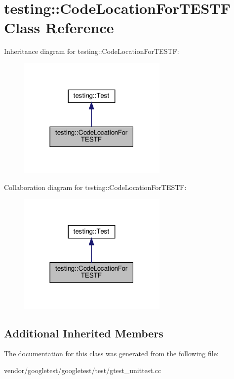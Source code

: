 \hypertarget{classtesting_1_1_code_location_for_t_e_s_t_f}{}\section{testing\+:\+:Code\+Location\+For\+T\+E\+S\+TF Class Reference}
\label{classtesting_1_1_code_location_for_t_e_s_t_f}


Inheritance diagram for testing\+:\+:Code\+Location\+For\+T\+E\+S\+TF\+:
\nopagebreak
\begin{figure}[H]
\begin{center}
\leavevmode
\includegraphics[width=206pt]{classtesting_1_1_code_location_for_t_e_s_t_f__inherit__graph}
\end{center}
\end{figure}


Collaboration diagram for testing\+:\+:Code\+Location\+For\+T\+E\+S\+TF\+:
\nopagebreak
\begin{figure}[H]
\begin{center}
\leavevmode
\includegraphics[width=206pt]{classtesting_1_1_code_location_for_t_e_s_t_f__coll__graph}
\end{center}
\end{figure}
\subsection*{Additional Inherited Members}


The documentation for this class was generated from the following file\+:\begin{DoxyCompactItemize}
\item 
vendor/googletest/googletest/test/gtest\+\_\+unittest.\+cc\end{DoxyCompactItemize}
